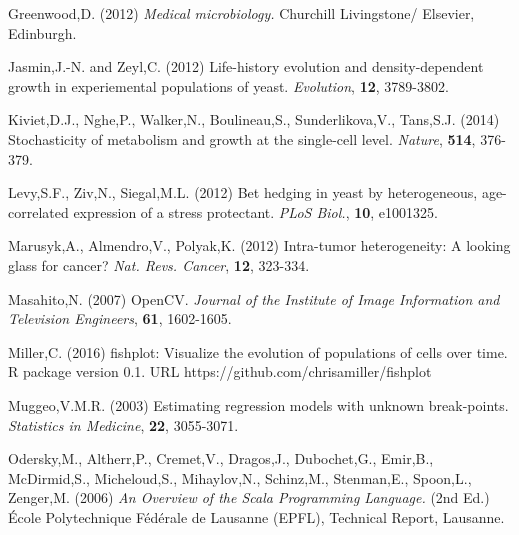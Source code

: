 \documentclass{bioinfo}
\begin{document}
{\begin{thebibliography}{}
 Greenwood,D. (2012) \textit{Medical microbiology.} Churchill Livingstone/ Elsevier, Edinburgh. 

 Jasmin,J.-N. and Zeyl,C. (2012) Life-history evolution and density-dependent growth in experiemental populations of yeast. \textit{Evolution}, \textbf{12}, 3789-3802.

Kiviet,D.J., Nghe,P., Walker,N., Boulineau,S., Sunderlikova,V., Tans,S.J. (2014) Stochasticity of metabolism and growth at the single-cell level. {\it Nature}, {\bf 514}, 376-379.


 Levy,S.F., Ziv,N., Siegal,M.L. (2012) Bet hedging in yeast by heterogeneous, age-correlated expression of a stress protectant. {\it PLoS Biol.}, {\bf 10}, e1001325.

Marusyk,A., Almendro,V., Polyak,K. (2012) Intra-tumor heterogeneity: A looking glass for cancer? \textit{Nat. Revs. Cancer}, \textbf{12}, 323-334.

Masahito,N. (2007) OpenCV. \textit{Journal of the Institute of Image Information and Television Engineers}, \textbf{61}, 1602-1605.

 Miller,C. (2016) fishplot: Visualize the evolution of populations of cells over time. R package version 0.1. URL https://github.com/chrisamiller/fishplot

Muggeo,V.M.R. (2003) Estimating regression models with unknown break-points. \textit{Statistics in Medicine}, \textbf{22}, 3055-3071.


Odersky,M., Altherr,P., Cremet,V., Dragos,J., Dubochet,G., Emir,B., McDirmid,S., Micheloud,S., Mihaylov,N., Schinz,M., Stenman,E., Spoon,L., Zenger,M. (2006) \textit{An Overview of the Scala Programming Language.} (2nd Ed.) \'{E}cole Polytechnique F\'{e}d\'{e}rale de Lausanne (EPFL), Technical Report, Lausanne. 


\end{thebibliography}}
\end{document}
